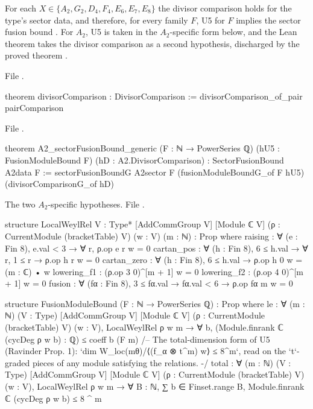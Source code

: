 \begin{theorem}\label{l24:thm:seven}
For each $X\in\{A_2,G_2,D_4,F_4,E_6,E_7,E_8\}$ the divisor comparison holds for the type's sector data, and therefore,
for every family $F$, U5 for $F$ implies the sector fusion bound . For $A_2$, U5 is
taken in the $A_2$-specific form  below, and the Lean theorem takes the divisor
comparison as a second hypothesis, discharged by the proved theorem .
\end{theorem}
\noindent File .
\begin{leancode}
theorem divisorComparison : DivisorComparison := divisorComparison_of_pair pairComparison
\end{leancode}
\noindent File .
\begin{leancode}
theorem A2_sectorFusionBound_generic (F : ℕ → PowerSeries ℚ) (hU5 : FusionModuleBound F)
    (hD : A2.DivisorComparison) : SectorFusionBound A2data F :=
  sectorFusionBoundG A2sector F (fusionModuleBoundG_of F hU5) (divisorComparisonG_of hD)
\end{leancode}
\noindent The two $A_2$-specific hypotheses. File .
\begin{leancode}
structure LocalWeylRel {V : Type*} [AddCommGroup V] [Module ℂ V]
    (ρ : CurrentModule (bracketTable) V) (w : V) (m : ℕ) : Prop where
  raising : ∀ (e : Fin 8), e.val < 3 → ∀ r, ρ.op e r w = 0
  cartan_pos : ∀ (h : Fin 8), 6 ≤ h.val → ∀ r, 1 ≤ r → ρ.op h r w = 0
  cartan_zero : ∀ (h : Fin 8), 6 ≤ h.val → ρ.op h 0 w = (m : ℂ) • w
  lowering_f1 : (ρ.op 3 0)^[m + 1] w = 0
  lowering_f2 : (ρ.op 4 0)^[m + 1] w = 0
  fusion : ∀ (fα : Fin 8), 3 ≤ fα.val → fα.val < 6 → ρ.op fα m w = 0

structure FusionModuleBound (F : ℕ → PowerSeries ℚ) : Prop where
  le : ∀ (m : ℕ) (V : Type) [AddCommGroup V] [Module ℂ V] (ρ : CurrentModule (bracketTable) V)
    (w : V), LocalWeylRel ρ w m → ∀ b, (Module.finrank ℂ (cycDeg ρ w b) : ℚ) ≤ coeff b (F m)
  /-- The total-dimension form of U5 (Ravinder Prop. 1): `dim W_loc(mθ)/⟨(f_α ⊗ t^m) w⟩ ≤ 8^m`,
  read on the `t`-graded pieces of any module satisfying the relations. -/
  total : ∀ (m : ℕ) (V : Type) [AddCommGroup V] [Module ℂ V] (ρ : CurrentModule (bracketTable) V)
    (w : V), LocalWeylRel ρ w m → ∀ B : ℕ,
      ∑ b ∈ Finset.range B, Module.finrank ℂ (cycDeg ρ w b) ≤ 8 ^ m
\end{leancode}
